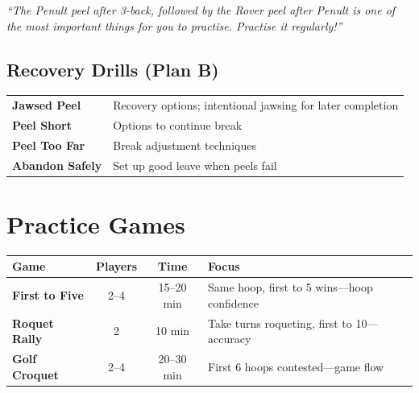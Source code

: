 \documentclass[11pt,a4paper]{article}
\begin{document}
\begin{tcolorbox}[drillbox, title={Delayed Double Peel---ESSENTIAL}]
\textit{``The Penult peel after 3-back, followed by the Rover peel after Penult is one of the most important things for you to practise. Practise it regularly!''}
\end{tcolorbox}

\subsection*{Recovery Drills (Plan B)}
\begin{tabular}{@{}p{4cm}p{10.5cm}@{}}
\textbf{Jawsed Peel} & Recovery options; intentional jawsing for later completion \\
\textbf{Peel Short} & Options to continue break \\
\textbf{Peel Too Far} & Break adjustment techniques \\
\textbf{Abandon Safely} & Set up good leave when peels fail \\
\end{tabular}

\section{Practice Games}

\begin{tabular}{@{}p{3cm}ccp{7cm}@{}}
\toprule
\textbf{Game} & \textbf{Players} & \textbf{Time} & \textbf{Focus} \\
\midrule
\textbf{First to Five} & 2--4 & 15--20 min & Same hoop, first to 5 wins---hoop confidence \\
\textbf{Roquet Rally} & 2 & 10 min & Take turns roqueting, first to 10---accuracy \\
\textbf{Golf Croquet} & 2--4 & 20--30 min & First 6 hoops contested---game flow \\
\bottomrule
\end{tabular}

\vspace{1em}

\begin{center}
\end{center}
\end{document}
